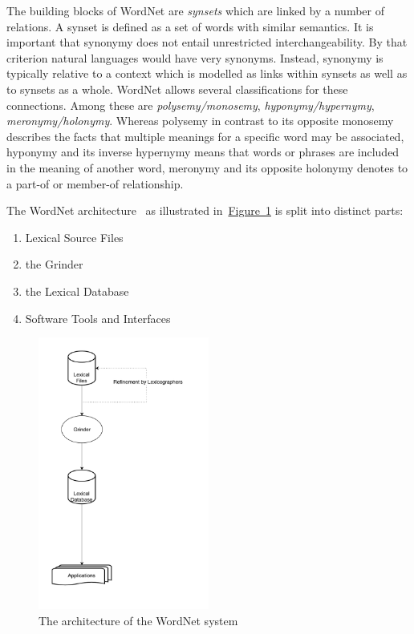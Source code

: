 \documentclass[draft,final]{vutinfth} %
\begin{document}
The building blocks of WordNet are \textit{synsets} which are linked by a number of relations. A synset is defined as a set of words with similar semantics. It is important that synonymy does not entail unrestricted interchangeability. By that criterion natural languages would have very synonyms. Instead, synonymy is typically relative to a context which is modelled as links within synsets as well as to synsets as a whole. WordNet allows several classifications for these connections. Among these are \textit{polysemy/monosemy}, \textit{hyponymy/hypernymy}, \textit{meronymy/holonymy}. Whereas polysemy in contrast to its opposite monosemy describes the facts that multiple meanings for a specific word may be associated, hyponymy and its inverse hypernymy means that words or phrases are included in the meaning of another word, meronymy and its opposite holonymy denotes to a part-of or member-of relationship.

The WordNet architecture~\cite{fellbaum1998} as illustrated in~\hyperref[fig:wordnet_architecture]{Figure~\ref*{fig:wordnet_architecture}} is split into distinct parts:
\begin{enumerate}
		\item Lexical Source Files
		\item the Grinder
		\item the Lexical Database
		\item Software Tools and Interfaces
\end{enumerate}

\begin{figure}
	 \centering
	 \includegraphics[width=0.5\textwidth]{drawio/WordNet_Architecture}
	 \caption{The architecture of the WordNet system~\cite{fellbaum1998}}\label{fig:wordnet_architecture}
\end{figure}
\end{document}
